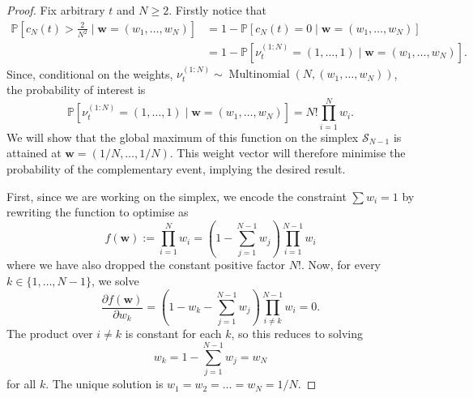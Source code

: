 \documentclass{article}
\newcommand{\PR}{\mathbb{P}}
\newcommand{\Mn}{\operatorname{Multinomial}}
\begin{document}
\begin{proof}
Fix arbitrary $t$ and $N\geq 2$. Firstly notice that
\begin{align*}
\PR \left[c_N(t) > \frac{2}{N^2} \mid \mathbf{w}=(w_1, \dots, w_N) \right]
&= 1- \PR[c_N(t) = 0  \mid \mathbf{w}=(w_1, \dots, w_N)] \\
&= 1- \PR[\nu_t^{(1:N)} = (1,\dots, 1) \mid \mathbf{w}=(w_1, \dots, w_N)].
\end{align*}
Since, conditional on the weights, $\nu_t^{(1:N)} \sim \Mn(N, (w_1, \dots, w_N))$, the probability of interest is
\begin{equation}\label{eq:mn_nomerger_prob}
\PR[\nu_t^{(1:N)} = (1,\dots, 1) \mid \mathbf{w}=(w_1, \dots, w_N)] =
N! \prod_{i=1}^N w_i .
\end{equation}
We will show that the global maximum of this function on the simplex $\mathcal{S}_{N-1}$ is attained at $\mathbf{w}=(1/N,\dots,1/N)$.
This weight vector will therefore minimise the probability of the complementary event, implying the desired result.

First, since we are working on the simplex, we encode the constraint $\sum w_i =1$ by rewriting the function to optimise as
\begin{equation*}
f(\mathbf{w}) :=
\prod_{i=1}^N w_i
= \left(1- \sum_{j=1}^{N-1} w_j \right)\prod_{i=1}^{N-1} w_i 
\end{equation*}
where we have also dropped the constant positive factor $N!$. 
Now, for every $k \in \{1,\dots,N-1\}$, we solve
\begin{equation*}
\frac{\partial f(\mathbf{w})}{\partial w_k}
= \left(1- w_k - \sum_{j=1}^{N-1} w_j \right)\prod_{i\neq k}^{N-1} w_i 
=0 .
\end{equation*}
The product over $i \neq k$ is constant for each $k$, so this reduces to solving
\begin{equation*}
w_k = 1- \sum_{j=1}^{N-1} w_j = w_N
\end{equation*}
for all $k$.
The unique solution is
$w_1 = w_2= \dots =  w_N = 1/N$.


\end{proof}
\end{document}
